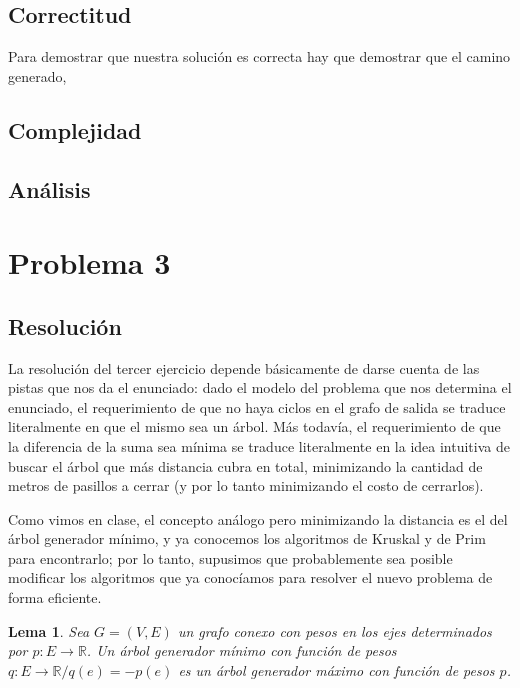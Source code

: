 \documentclass{article}
\newtheorem{lemma}{Lema}[theorem]
\theoremstyle{definition}
\theoremstyle{remark}
\begin{document}
\subsection{Correctitud}
Para demostrar que nuestra solución es correcta hay que demostrar que el camino generado, 

\subsection{Complejidad}

\subsection{Análisis}

\pagebreak

\section{Problema 3}

\subsection{Resolución}

La resolución del tercer ejercicio depende básicamente de darse cuenta de las pistas que nos da el enunciado: dado el modelo del problema que nos determina el enunciado, el requerimiento de que no haya ciclos en el grafo de salida se traduce literalmente en que el mismo sea un árbol. Más todavía, el requerimiento de que la diferencia de la suma sea mínima se traduce literalmente en la idea intuitiva de buscar el árbol que más distancia cubra en total, minimizando la cantidad de metros de pasillos a cerrar (y por lo tanto minimizando el costo de cerrarlos).

Como vimos en clase, el concepto análogo pero minimizando la distancia es el del árbol generador mínimo, y ya conocemos los algoritmos de Kruskal y de Prim para encontrarlo; por lo tanto, supusimos que probablemente sea posible modificar los algoritmos que ya conocíamos para resolver el nuevo problema de forma eficiente.

\begin{lemma}
Sea $G = (V, E)$ un grafo conexo con pesos en los ejes determinados por $p : E \to \mathbb{R}$. Un árbol generador mínimo con función de pesos $q : E \to \mathbb{R} / q(e) = -p(e)$ es un árbol generador máximo con función de pesos $p$.
\label{pr:agm}
\end{lemma}
\end{document}
